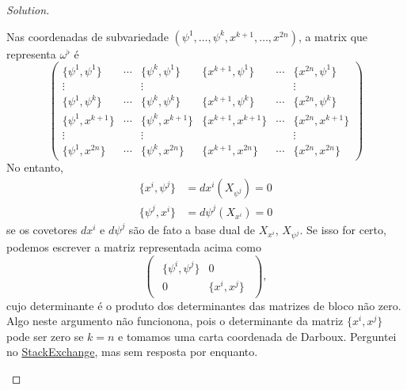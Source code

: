 \begin{proof}[Solution]
\begin{enumerate}[label=\alph*.]
	Nas coordenadas de subvariedade $(\psi^1,\ldots,\psi^k,x^{k+1},\ldots,x^{2n})$, a matrix que representa $\omega^\flat$ \'e
	\[\begin{pmatrix} \{\psi^1,\psi^1\} &\cdots &\{\psi^k,\psi^1\} &\{x^{k+1},\psi^1\} &\cdots &\{x^{2n},\psi^1\}\\
	\vdots &&\vdots &&&\vdots\\
\{\psi^1,\psi^k\} &\cdots &\{\psi^k,\psi^k\} &\{x^{k+1},\psi^k\} &\cdots &\{x^{2n},\psi^k\}\\
	\{\psi^1,x^{k+1}\} &\cdots &\{\psi^k,x^{k+1}\} &\{x^{k+1},x^{k+1}\} &\cdots &\{x^{2n},x^{k+1}\} \\
	\vdots &&\vdots &&&\vdots\\
	\{\psi^1,x^{2n}\} &\cdots &\{\psi^k,x^{2n}\} &\{x^{k+1},x^{2n}\} &\cdots &\{x^{2n},x^{2n}\}
\end{pmatrix}\]
No entanto,
\begin{align*}
	\{x^i,\psi^j\}&=dx^i(X_{\psi^j})=0\\
\{\psi^j,x^i\} &=d\psi^j(X_{x^i})=0
\end{align*}
se os covetores $dx^i$ e $d\psi^j$ s\~ao de fato a base dual de $X_{x^i}$, $X_{\psi^j}$. Se isso for certo, podemos escrever a matriz representada acima como
\[\begin{pmatrix}\begin{array}{c|c}
	\{\psi^i,\psi^j\}&0\\ \hline
	0&\{x^i,x^j\} 
\end{array}  \end{pmatrix}, \]
cujo determinante \'e o produto dos determinantes das matrizes de bloco n\~ao zero. Algo neste argumento não funcionona, pois o determinante da matriz $\{x^i,x^j\}$ pode ser zero se $k=n$ e tomamos uma carta coordenada de Darboux. Perguntei no \href{https://math.stackexchange.com/questions/4974063/level-set-submanifold-is-symplectic-iff-poisson-bracket-matrix-is-nonsingular}{StackExchange}, mas sem resposta por enquanto.


\end{enumerate}
\end{proof}
